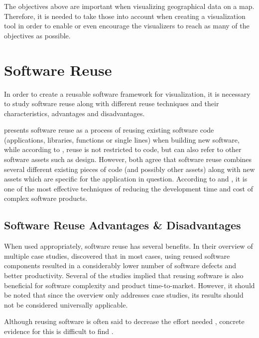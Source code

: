 The objectives above are important when visualizing geographical data on a map. Therefore, it is needed to take those into account when creating a visualization tool in order to enable or even encourage the visualizers to reach as many of the objectives as possible.

\chapter{Software Reuse}
\label{chapter:reuse}

In order to create a reusable software framework for visualization, it is necessary to study software reuse along with different reuse techniques and their characteristics, advantages and disadvantages.

\citet{krueger_software_1992} presents software reuse as a process of reusing existing software code (applications, libraries, functions or single lines) when building new software, while according to \citet{mohagheghi_empirical_2008}, reuse is not restricted to code, but can also refer to other software assets such as design. However, both agree that software reuse combines several different existing pieces of code (and possibly other assets) along with new assets which are specific for the application in question. According to \citet{mcilroy_mass-produced_1969} and \citet{boehm_managing_1999}, it is one of the most effective techniques of reducing the development time and cost of complex software products.

\section{Software Reuse Advantages \& Disadvantages}

When used appropriately, software reuse has several benefits. In their overview of multiple case studies, \citet{mohagheghi_empirical_2008} discovered that in most cases, using reused software components resulted in a considerably lower number of software defects and better productivity. Several of the studies implied that reusing software is also beneficial for software complexity and product time-to-market. However, it should be noted that since the overview only addresses case studies, its results should not be considered universally applicable.

Although reusing software is often said to decrease the effort needed \citep{mcilroy_mass-produced_1969, boehm_managing_1999, mohagheghi_empirical_2008}, concrete evidence for this is difficult to find \citep{mohagheghi_empirical_2008}.


